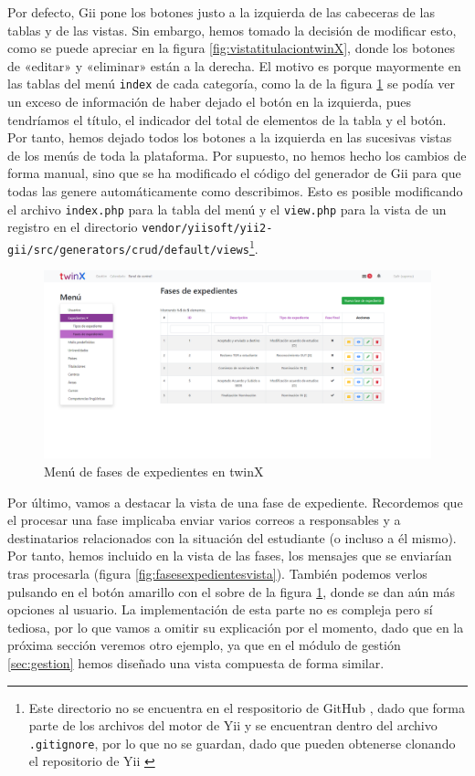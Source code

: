 Por defecto, Gii pone los botones justo a la izquierda de las cabeceras de las tablas y de las vistas. Sin embargo, hemos tomado la decisión de modificar esto, como se puede apreciar en la figura \ref{fig:vistatitulaciontwinX}, donde los botones de «editar» y «eliminar» están a la derecha. El motivo es porque mayormente en las tablas del menú \texttt{index} de cada categoría, como la de la figura \ref{fig:fasesexpedientesindex} se podía ver un exceso de información de haber dejado el botón en la izquierda, pues tendríamos el título, el indicador del total de elementos de la tabla y el botón. Por tanto, hemos dejado todos los botones a la izquierda en las sucesivas vistas de los menús de toda la plataforma. Por supuesto, no hemos hecho los cambios de forma manual, sino que se ha modificado el código del generador de Gii para que todas las genere automáticamente como describimos. Esto es posible modificando el archivo \texttt{index.php} para la tabla del menú y el \texttt{view.php} para la vista de un registro en el directorio \texttt{vendor/yiisoft/yii2-gii/src/generators/crud/default/views}\footnote{Este directorio no se encuentra en el respositorio de GitHub \cite{repogit}, dado que forma parte de los archivos del motor de Yii y se encuentran dentro del archivo \texttt{.gitignore}, por lo que no se guardan, dado que pueden obtenerse clonando el repositorio de Yii \cite{yii2advanced}}.

\begin{figure}
	\centering
	\includegraphics[width=\textwidth]{Capturas de twinX/fases_expedientes_index}
	\caption{Menú de fases de expedientes en twinX}
	\label{fig:fasesexpedientesindex}
\end{figure}

Por último, vamos a destacar la vista de una fase de expediente. Recordemos que el procesar una fase implicaba enviar varios correos a responsables y a destinatarios relacionados con la situación del estudiante (o incluso a él mismo). Por tanto, hemos incluido en la vista de las fases, los mensajes que se enviarían tras procesarla (figura \ref{fig:fasesexpedientesvista}). También podemos verlos pulsando en el botón amarillo con el sobre de la figura \ref{fig:fasesexpedientesindex}, donde se dan aún más opciones al usuario. La implementación de esta parte no es compleja pero sí tediosa, por lo que vamos a omitir su explicación por el momento, dado que en la próxima sección veremos otro ejemplo, ya que en el módulo de gestión \ref{sec:gestion} hemos diseñado una vista compuesta de forma similar.

